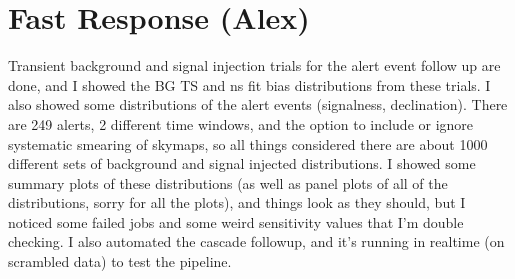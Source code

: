 \section{Fast Response (Alex)}
Transient background and signal injection trials for the alert event follow up are done, and I showed the BG TS and ns fit bias distributions from these trials. I also showed some distributions of the alert events (signalness, declination). There are 249 alerts, 2 different time windows, and the option to include or ignore systematic smearing of skymaps, so all things considered there are about 1000 different sets of background and signal injected distributions. I showed some summary plots of these distributions (as well as panel plots of all of the distributions, sorry for all the plots), and things look as they should, but I noticed some failed jobs and some weird sensitivity values that I'm double checking. I also automated the cascade followup, and it's running in realtime (on scrambled data) to test the pipeline.